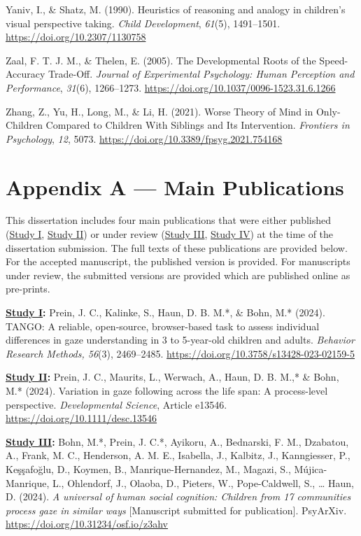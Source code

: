 \documentclass[
]{scrbook}
\newlength{\cslhangindent}
\newenvironment{CSLReferences}[2] %
 {\begin{list}{}{%
  \setlength{\itemindent}{0pt}
  \setlength{\leftmargin}{0pt}
  \setlength{\parsep}{0pt}
  \ifodd #1
   \setlength{\leftmargin}{\cslhangindent}
   \setlength{\itemindent}{-1\cslhangindent}
  \fi
  \setlength{\itemsep}{#2\baselineskip}}}
 {\end{list}}
\begin{document}
\begin{CSLReferences}{1}{0}
Yaniv, I., \& Shatz, M. (1990). Heuristics of reasoning and analogy in children's visual perspective taking. \emph{Child Development}, \emph{61}(5), 1491--1501. \url{https://doi.org/10.2307/1130758}

Zaal, F. T. J. M., \& Thelen, E. (2005). The {Developmental Roots} of the {Speed-Accuracy Trade-Off}. \emph{Journal of Experimental Psychology: Human Perception and Performance}, \emph{31}(6), 1266--1273. \url{https://doi.org/10.1037/0096-1523.31.6.1266}

Zhang, Z., Yu, H., Long, M., \& Li, H. (2021). Worse {Theory} of {Mind} in {Only-Children Compared} to {Children With Siblings} and {Its Intervention}. \emph{Frontiers in Psychology}, \emph{12}, 5073. \url{https://doi.org/10.3389/fpsyg.2021.754168}

\end{CSLReferences}

\chapter{Appendix A --- Main Publications}\label{appendixA}

This dissertation includes four main publications that were either published (\hyperref[studyI]{Study I}, \hyperref[studyII]{Study II}) or under review (\hyperref[studyIII]{Study III}, \hyperref[studyIV]{Study IV}) at the time of the dissertation submission. The full texts of these publications are provided below. For the accepted manuscript, the published version is provided. For manuscripts under review, the submitted versions are provided which are published online as pre-prints.

\textbf{\hyperref[studyI]{Study I}:} Prein, J. C., Kalinke, S., Haun, D. B. M.*, \& Bohn, M.* (2024). TANGO: A reliable, open-source, browser-based task to assess individual differences in gaze understanding in 3 to 5-year-old children and adults. \emph{Behavior Research Methods, 56}(3), 2469--2485. \mbox{\url{https://doi.org/10.3758/s13428-023-02159-5}}

\textbf{\hyperref[studyII]{Study II}:} Prein, J. C., Maurits, L., Werwach, A., Haun, D. B. M.,* \& Bohn, M.* (2024). Variation in gaze following across the life span: A process-level perspective. \emph{Developmental Science}, Article e13546. \mbox{\url{https://doi.org/10.1111/desc.13546}}

\textbf{\hyperref[studyIII]{Study III}:} Bohn, M.*, Prein, J. C.*, Ayikoru, A., Bednarski, F. M., Dzabatou, A., Frank, M. C., Henderson, A. M. E., Isabella, J., Kalbitz, J., Kanngiesser, P., Keşşafoğlu, D., Koymen, B., Manrique-Hernandez, M., Magazi, S., Mújica-Manrique, L., Ohlendorf, J., Olaoba, D., Pieters, W., Pope-Caldwell, S., \ldots{} Haun, D. (2024). \emph{A universal of human social cognition: Children from 17 communities process gaze in similar ways} {[}Manuscript submitted for publication{]}. PsyArXiv. \mbox{\url{https://doi.org/10.31234/osf.io/z3ahv}}
\end{document}
